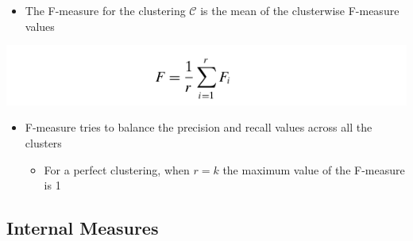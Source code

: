 \documentclass[11pt]{article}
\begin{document}
\begin{enumerate}
\begin{itemize}
\item The F-measure for the clustering \(\mathcal C\) is the mean of the clusterwise F-measure values
\end{itemize}
\begin{center}
\includegraphics[width=.9\linewidth]{Clustering Validation/screenshot_2018-11-27_22-56-45.png}
\end{center}
\begin{itemize}
\item F-measure tries to balance the precision and recall values across all the clusters
\begin{itemize}
\item For a perfect clustering, when \(r=k\) the maximum value of the F-measure is 1
\end{itemize}
\end{itemize}
\end{enumerate}

\subsection{Internal Measures}
\label{sec:org1391f80}
\end{document}

